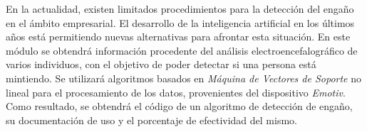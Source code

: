 En la actualidad, existen limitados procedimientos para la detección del engaño en el ámbito empresarial. El desarrollo de la inteligencia artificial en los últimos años está permitiendo nuevas alternativas para afrontar esta situación. En este módulo se obtendrá información procedente del análisis electroencefalográfico de varios individuos, con el objetivo de poder detectar si una persona está mintiendo. Se utilizará algoritmos basados en \textit{Máquina de Vectores de Soporte} no lineal para el procesamiento de los datos, provenientes del dispositivo \textit{Emotiv}. Como resultado, se obtendrá el código de un algoritmo de detección de engaño, su documentación de uso y el porcentaje de efectividad del mismo. 